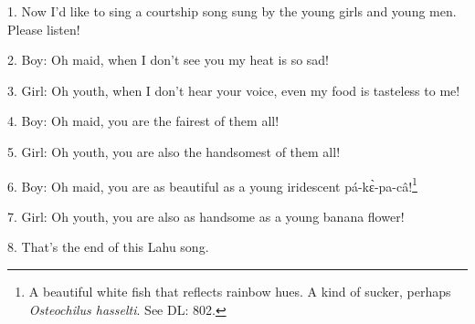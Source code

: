 \setcounter{footnote}{0}

1. Now I'd like to sing a courtship song sung by the young girls and young men.
Please listen!

2. Boy: Oh maid, when I don't see you my heat is so sad!

3. Girl: Oh youth, when I don't hear your voice, even my food is tasteless to me!

4. Boy: Oh maid, you are the fairest of them all!

5. Girl: Oh youth, you are also the handsomest of them all!

6. Boy: Oh maid, you are as beautiful as a young iridescent pá-kɛ̀-pa-câ!\footnote{A beautiful white fish that reflects rainbow hues. A kind of sucker, perhaps \textit{Osteochilus hasselti}. See DL: 802.}

7. Girl: Oh youth, you are also as handsome as a young banana flower!

8. That's the end of this Lahu song.

